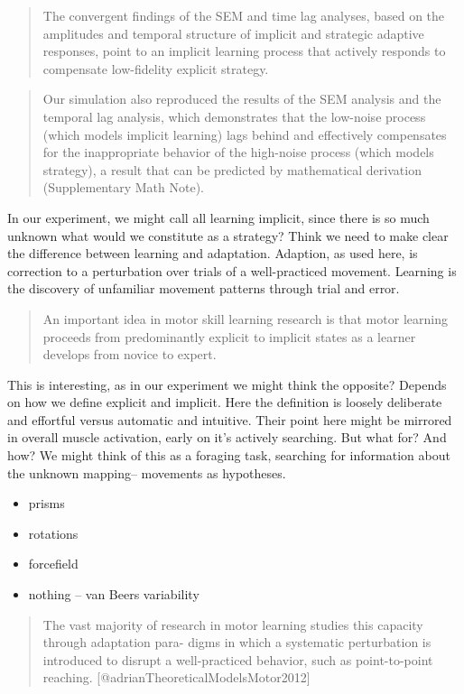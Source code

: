 \begin{quote}
The convergent findings of the SEM and time lag analyses, based on the
amplitudes and temporal structure of implicit and strategic adaptive
responses, point to an implicit learning process that actively responds
to compensate low-fidelity explicit strategy.
\end{quote}

\begin{quote}
Our simulation also reproduced the results of the SEM analysis and the
temporal lag analysis, which demonstrates that the low-noise process
(which models implicit learning) lags behind and effectively compensates
for the inappropriate behavior of the high-noise process (which models
strategy), a result that can be predicted by mathematical derivation
(Supplementary Math Note).
\end{quote}

In our experiment, we might call all learning implicit, since there is
so much unknown what would we constitute as a strategy? Think we need to
make clear the difference between learning and adaptation. Adaption, as
used here, is correction to a perturbation over trials of a
well-practiced movement. Learning is the discovery of unfamiliar
movement patterns through trial and error.

\begin{quote}
An important idea in motor skill learning research is that motor
learning proceeds from predominantly explicit to implicit states as a
learner develops from novice to expert.
\end{quote}

This is interesting, as in our experiment we might think the opposite?
Depends on how we define explicit and implicit. Here the definition is
loosely deliberate and effortful versus automatic and intuitive. Their
point here might be mirrored in overall muscle activation, early on it's
actively searching. But what for? And how? We might think of this as a
foraging task, searching for information about the unknown mapping--
movements as hypotheses.

\begin{itemize}
\tightlist
\item
  prisms
\item
  rotations
\item
  forcefield
\item
  nothing -- van Beers variability
\end{itemize}

\begin{quote}
The vast majority of research in motor learning studies this capacity
through adaptation para- digms in which a systematic perturbation is
introduced to disrupt a well-practiced behavior, such as point-to-point
reaching. {[}@adrianTheoreticalModelsMotor2012{]}
\end{quote}

